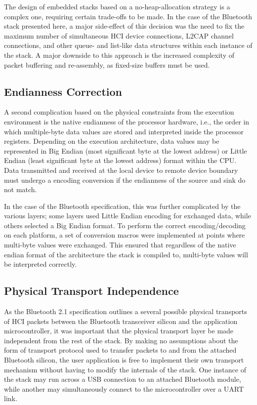 The design of embedded stacks based on a no-heap-allocation strategy is a complex one, requiring certain trade-offs to be made. In the case of the Bluetooth stack presented here, a major side-effect of this decision was the need to fix the maximum number of simultaneous HCI device connections, L2CAP channel connections, and other queue- and list-like data structures within each instance of the stack. A major downside to this approach is the increased complexity of packet buffering and re-assembly, as fixed-size buffers must be used.

\FloatBarrier
\subsection{Endianness Correction}

A second complication based on the physical constraints from the execution environment is the native endianness of the processor hardware, i.e., the order in which multiple-byte data values are stored and interpreted inside the processor registers. Depending on the execution architecture, data values may be represented in Big Endian (most significant byte at the lowest address) or Little Endian (least significant byte at the lowest address) format within the CPU. Data transmitted and received at the local device to remote device boundary must undergo a encoding conversion if the endianness of the source and sink do not match.

In the case of the Bluetooth specification, this was further complicated by the various layers; some layers used Little Endian encoding for exchanged data, while others selected a Big Endian format. To perform the correct encoding/decoding on each platform, a set of conversion macros were implemented at points where multi-byte values were exchanged. This ensured that regardless of the native endian format of the architecture the stack is compiled to, multi-byte values will be interpreted correctly.

\FloatBarrier
\subsection{Physical Transport Independence}

As the Bluetooth 2.1 specification outlines a several possible physical transports of HCI packets between the Bluetooth transceiver silicon and the application microcontroller, it was important that the physical transport layer be made independent from the rest of the stack. By making no assumptions about the form of transport protocol used to transfer packets to and from the attached Bluetooth silicon, the user application is free to implement their own transport mechanism without having to modify the internals of the stack. One instance of the stack may run across a USB connection to an attached Bluetooth module, while another may simultaneously connect to the microcontroller over a UART link.

